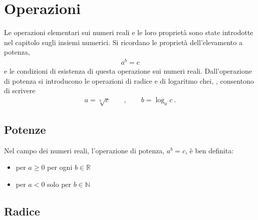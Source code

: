 \documentclass[letterpaper,10pt,italian]{jupyterBook}
\begin{document}
\section{Operazioni}
\label{\detokenize{ch/algebra/real-algebra:operazioni}}
\sphinxAtStartPar
Le operazioni elementari sui numeri reali e le loro proprietà sono state introdotte nel capitolo sugli insiemi numerici. Si ricordano le proprietà dell’elevamento a potenza,
\begin{equation*}
\begin{split}a^b = c\end{split}
\end{equation*}
\sphinxAtStartPar
e le condizioni di esistenza di questa operazione sui numeri reali. Dall’operazione di potenza si introducono le operazioni di radice e di logaritmo chei, , consentono di scrivere
\begin{equation*}
\begin{split}a = \sqrt[b]{c} \qquad , \qquad b = \log_{a} c \ .\end{split}
\end{equation*}

\subsection{Potenze}
\label{\detokenize{ch/algebra/real-algebra:potenze}}
\sphinxAtStartPar
Nel campo dei numeri reali, l’operazione di potenza, \(a^b = c\), è ben definita:
\begin{itemize}
\item {} 
\sphinxAtStartPar
per \(a \ge 0\) per ogni \(b \in \mathbb{R}\)

\item {} 
\sphinxAtStartPar
per \(a < 0\) solo per \(b \in \mathbb{N}\)

\end{itemize}

\sphinxAtStartPar
{} 


\subsection{Radice}
\label{\detokenize{ch/algebra/real-algebra:radice}}\label{\detokenize{ch/algebra/real-algebra:math-hs-algebra-real-root}}
\sphinxAtStartPar
{}
\end{document}
